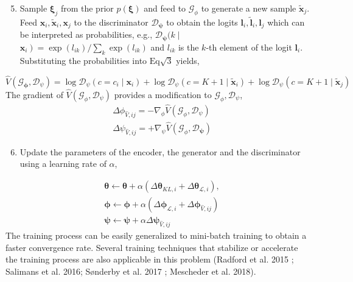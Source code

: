 \documentclass[10pt]{article}
\begin{document}
\begin{enumerate}
  \setcounter{enumi}{4}
  \item Sample $\boldsymbol{\xi}_{j}$ from the prior $p(\boldsymbol{\xi})$ and feed to $\mathcal{G}_{\phi}$ to generate a new sample $\tilde{\boldsymbol{x}}_{j}$. Feed $\boldsymbol{x}_{i}, \tilde{\boldsymbol{x}}_{i}, \boldsymbol{x}_{j}$ to the discriminator $\mathcal{D}_{\boldsymbol{\psi}}$ to obtain the logits $\boldsymbol{l}_{i}, \tilde{\boldsymbol{l}}_{i}, \boldsymbol{l}_{j}$ which can be interpreted as probabilities, e.g., $\mathcal{D}_{\boldsymbol{\psi}}(k \mid$ $\left.\boldsymbol{x}_{i}\right)=\exp \left(l_{i k}\right) / \sum_{k} \exp \left(l_{i k}\right)$ and $l_{i k}$ is the $k$-th element of the logit $\boldsymbol{l}_{i}$. Substituting the probabilities into $\mathrm{Eq} \sqrt{3}$ yields,
\end{enumerate}
$$
\hat{V}\left(\mathcal{G}_{\boldsymbol{\phi}}, \mathcal{D}_{\psi}\right)=\log \mathcal{D}_{\psi}\left(c=c_{i} \mid \boldsymbol{x}_{i}\right)+\log \mathcal{D}_{\psi}\left(c=K+1 \mid \tilde{\boldsymbol{x}}_{i}\right)+\log \mathcal{D}_{\psi}\left(c=K+1 \mid \tilde{\boldsymbol{x}}_{j}\right)
$$
The gradient of $\hat{V}\left(\mathcal{G}_{\phi}, \mathcal{D}_{\psi}\right)$ provides a modification to $\mathcal{G}_{\phi}, \mathcal{D}_{\psi}$,
$$
\begin{aligned}
&\Delta \phi_{\hat{V}, i j}=-\nabla_{\phi} \hat{V}\left(\mathcal{G}_{\phi}, \mathcal{D}_{\psi}\right) \\
&\Delta \psi_{\hat{V}, i j}=+\nabla_{\psi} \hat{V}\left(\mathcal{G}_{\phi}, \mathcal{D}_{\boldsymbol{\psi}}\right)
\end{aligned}
$$

\begin{enumerate}
  \setcounter{enumi}{5}
  \item Update the parameters of the encoder, the generator and the discriminator using a learning rate of $\alpha$,
\end{enumerate}
$$
\begin{aligned}
&\boldsymbol{\theta} \leftarrow \boldsymbol{\theta}+\alpha\left(\Delta \boldsymbol{\theta}_{K L, i}+\Delta \boldsymbol{\theta}_{\mathcal{L}, i}\right), \\
&\boldsymbol{\phi} \leftarrow \boldsymbol{\phi}+\alpha\left(\Delta \boldsymbol{\phi}_{\mathcal{L}, i}+\Delta \boldsymbol{\phi}_{\hat{V}, i j}\right) \\
&\boldsymbol{\psi} \leftarrow \boldsymbol{\psi}+\alpha \Delta \boldsymbol{\psi}_{\hat{V}, i j}
\end{aligned}
$$
The training process can be easily generalized to mini-batch training to obtain a faster convergence rate. Several training techniques that stabilize or accelerate the training process are also applicable in this problem (Radford et al. 2015 ; Salimans et al. 2016; Sønderby et al. 2017 ; Mescheder et al. 2018).
\end{document}
